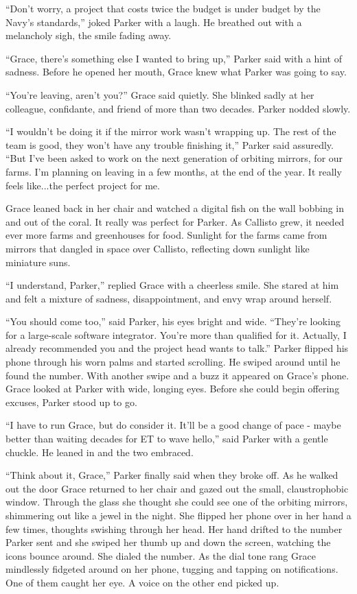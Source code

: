 \documentclass[openany, 12pt]{book} %
\begin{document}
``Don't worry, a project that costs twice the budget is under budget by the Navy's standards,'' joked Parker with a laugh. He breathed out with a melancholy sigh, the smile fading away.

``Grace, there's something else I wanted to bring up,'' Parker said with a hint of sadness. Before he opened her mouth, Grace knew what Parker was going to say.

``You're leaving, aren't you?'' Grace said quietly. She blinked sadly at her colleague, confidante, and friend of more than two decades. Parker nodded slowly.

``I wouldn't be doing it if the mirror work wasn't wrapping up. The rest of the team is good, they won't have any trouble finishing it,'' Parker said assuredly. ``But I've been asked to work on the next generation of orbiting mirrors, for our farms. I'm planning on leaving in a few months, at the end of the year. It really feels like...the perfect project for me.

Grace leaned back in her chair and watched a digital fish on the wall bobbing in and out of the coral. It really was perfect for Parker. As Callisto grew, it needed ever more farms and greenhouses for food. Sunlight for the farms came from mirrors that dangled in space over Callisto, reflecting down sunlight like miniature suns.

``I understand, Parker,'' replied Grace with a cheerless smile. She stared at him and felt a mixture of sadness, disappointment, and envy wrap around herself.

``You should come too,'' said Parker, his eyes bright and wide. ``They're looking for a large-scale software integrator. You're more than qualified for it. Actually, I already recommended you and the project head wants to talk.'' Parker flipped his phone through his worn palms and started scrolling. He swiped around until he found the number. With another swipe and a buzz it appeared on Grace's phone. Grace looked at Parker with wide, longing eyes. Before she could begin offering excuses, Parker stood up to go.

``I have to run Grace, but do consider it. It'll be a good change of pace - maybe better than waiting decades for ET to wave hello,'' said Parker with a gentle chuckle. He leaned in and the two embraced.

``Think about it, Grace,'' Parker finally said when they broke off. As he walked out the door Grace returned to her chair and gazed out the small, claustrophobic window. Through the glass she thought she could see one of the orbiting mirrors, shimmering out like a jewel in the night. She flipped her phone over in her hand a few times, thoughts swishing through her head. Her hand drifted to the number Parker sent and she swiped her thumb up and down the screen, watching the icons bounce around. She dialed the number. As the dial tone rang Grace mindlessly fidgeted around on her phone, tugging and tapping on notifications. One of them caught her eye. A voice on the other end picked up.
\end{document}
